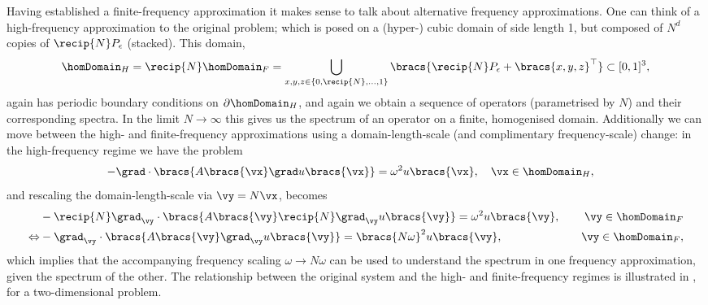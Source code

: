 Having established a finite-frequency approximation it makes sense to talk about alternative frequency approximations.
One can think of a high-frequency approximation to the original problem; which is posed on a (hyper-) cubic domain of side length 1, but composed of $N^{d}$ copies of $\recip{N}P_{\epsilon}$ (stacked).
This domain,
\begin{align*}
	\homDomain_{H} = \recip{N}\homDomain_{F} = \bigcup_{x,y,z\in\{0,\recip{N},...,1\}}\bracs{\recip{N}P_{\epsilon} + \bracs{x,y,z}^{\top}} \subset [0,1]^{3},
\end{align*}
again has periodic boundary conditions on $\partial\homDomain_{H}$, and again we obtain a sequence of operators (parametrised by $N$) and their corresponding spectra.
In the limit $N\rightarrow\infty$ this gives us the spectrum of an operator on a finite, homogenised domain.
Additionally we can move between the high- and finite-frequency approximations using a domain-length-scale (and complimentary frequency-scale) change: in the high-frequency regime we have the problem
\begin{align} \label{eq:HFEqn}
	-\grad\cdot\bracs{A\bracs{\vx}\grad u\bracs{\vx}} &= \omega^{2}u\bracs{\vx}, \quad \vx\in\homDomain_{H},
\end{align}
and rescaling the domain-length-scale via $\vy = N\vx$,  becomes
\begin{align}
	&-\recip{N}\grad_{\vy}\cdot\bracs{A\bracs{\vy}\recip{N}\grad_{\vy} u\bracs{\vy}} = \omega^{2}u\bracs{\vy}, &\quad \vy\in \homDomain_{F} \\
	\Leftrightarrow
	&-\grad_{\vy}\cdot\bracs{A\bracs{\vy}\grad_{\vy} u\bracs{\vy}} = \bracs{N\omega}^{2}u\bracs{\vy}, &\quad \vy\in\homDomain_{F},
\end{align}
which implies that the accompanying frequency scaling $\omega\rightarrow N\omega$ can be used to understand the spectrum in one frequency approximation, given the spectrum of the other.
The relationship between the original system and the high- and finite-frequency regimes is illustrated in , for a two-dimensional problem. 
